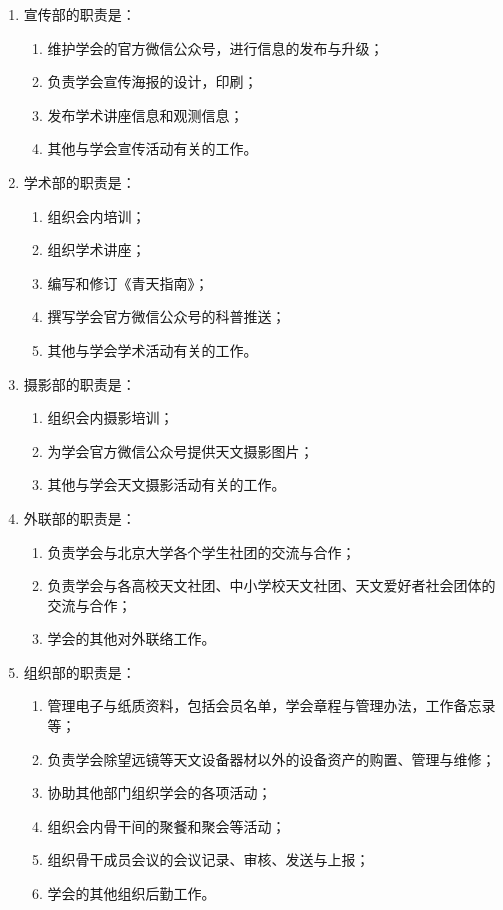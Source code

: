 \begin{enumerate}[resume]
    \item 宣传部的职责是：
    
    \begin{enumerate}
        \item 维护学会的官方微信公众号，进行信息的发布与升级；
        \item 负责学会宣传海报的设计，印刷；
        \item 发布学术讲座信息和观测信息；
        \item 其他与学会宣传活动有关的工作。
    \end{enumerate}
    
    \item 学术部的职责是：
    
    \begin{enumerate}
        \item 组织会内培训；
        \item 组织学术讲座；
        \item 编写和修订《青天指南》；
        \item 撰写学会官方微信公众号的科普推送；
        \item 其他与学会学术活动有关的工作。
    \end{enumerate}
    
    \item 摄影部的职责是：
    
    \begin{enumerate}
        \item 组织会内摄影培训；
        \item 为学会官方微信公众号提供天文摄影图片；
        \item 其他与学会天文摄影活动有关的工作。
    \end{enumerate}
    
    \item 外联部的职责是：
    
    \begin{enumerate}
        \item 负责学会与北京大学各个学生社团的交流与合作；
        \item 负责学会与各高校天文社团、中小学校天文社团、天文爱好者社会团体的交流与合作；
        \item 学会的其他对外联络工作。
    \end{enumerate}
    
    \item 组织部的职责是：
    
    \begin{enumerate}
        \item 管理电子与纸质资料，包括会员名单，学会章程与管理办法，工作备忘录等；
        \item 负责学会除望远镜等天文设备器材以外的设备资产的购置、管理与维修；
        \item 协助其他部门组织学会的各项活动；
        \item 组织会内骨干间的聚餐和聚会等活动；
        \item 组织骨干成员会议的会议记录、审核、发送与上报；
        \item 学会的其他组织后勤工作。
    \end{enumerate}


\end{enumerate}
